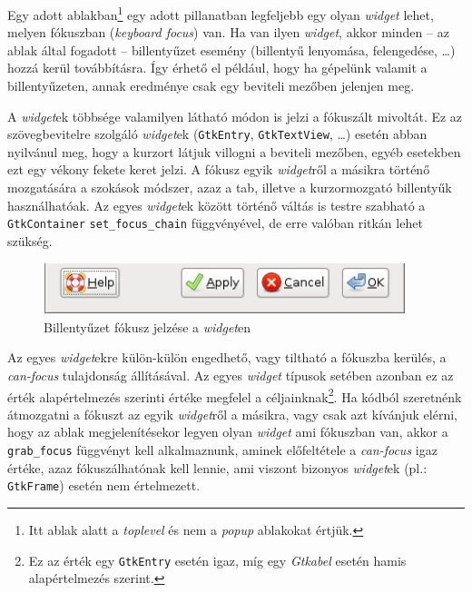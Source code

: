 Egy adott ablakban\footnote{Itt ablak alatt a \textit{toplevel} és nem a \textit{popup} ablakokat értjük.} egy adott pillanatban legfeljebb egy olyan \textit{widget} lehet, melyen fókuszban (\textit{keyboard focus}) van. Ha van ilyen \textit{widget}, akkor minden -- az ablak által fogadott -- billentyűzet esemény (billentyű lenyomása, felengedése, \dots) hozzá kerül továbbításra. Így érhető el például, hogy ha gépelünk valamit a billentyűzeten, annak eredménye csak egy beviteli mezőben jelenjen meg.

A \textit{widget}ek többsége valamilyen látható módon is jelzi a fókuszált mivoltát. Ez az szövegbevitelre szolgáló \textit{widget}ek (\texttt{GtkEntry}, \texttt{GtkTextView}, \dots) esetén abban nyilvánul meg, hogy a kurzort látjuk villogni a beviteli mezőben, egyéb esetekben ezt egy vékony fekete keret jelzi. A fókusz egyik \textit{widget}ről a másikra történő mozgatására a szokások módszer, azaz a tab, illetve a kurzormozgató billentyűk használhatóak. Az egyes \textit{widget}ek között történő váltás is testre szabható a \texttt{GtkContainer} \texttt{set\_focus\_chain} függvényével, de erre valóban ritkán lehet szükség.

\begin{figure}[H]
\begin{center}
\includegraphics[height=15mm]{images/widget-keyboard-focus.png}
\caption{Billentyűzet fókusz jelzése a \textit{widget}en}
\end{center}
\end{figure}

Az egyes \textit{widget}ekre külön-külön engedhető, vagy tiltható a fókuszba kerülés, a \textit{can-focus} tulajdonság állításával. Az egyes \textit{widget} típusok setében azonban ez az érték alapértelmezés szerinti értéke megfelel a céljainknak\footnote{Ez az érték egy \texttt{GtkEntry} esetén igaz, míg egy \textit{Gtkabel} esetén hamis alapértelmezés szerint.}. Ha kódból szeretnénk átmozgatni a fókuszt az egyik \textit{widget}ről a másikra, vagy csak azt kívánjuk elérni, hogy az ablak megjelenítésekor legyen olyan \textit{widget} ami fókuszban van, akkor a \texttt{grab\_focus} függvényt kell alkalmaznunk, aminek előfeltétele a \textit{can-focus} igaz értéke, azaz fókuszálhatónak kell lennie, ami viszont bizonyos \textit{widget}ek (pl.: \texttt{GtkFrame}) esetén nem értelmezett.

